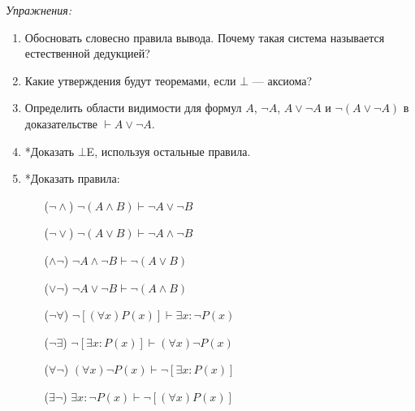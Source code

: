 {\it Упражнения:}
\begin{enumerate}
	\item{}Обосновать словесно правила вывода. Почему такая система называется
	естественной дедукцией?
	\item{}Какие утверждения будут теоремами, если $\bot$ --- аксиома?
	\item{}Определить области видимости для формул $A$, $\lnot A$, $A\lor\lnot A$
	и $\lnot(A\lor\lnot A)$ в доказательстве $\vdash A\lor\lnot A$.
	\item{}*Доказать $\bot$E, используя остальные правила.
	\pagebreak
	\item{}*Доказать правила:
	\begin{multicols}{2}
		\begin{enumerate}
			\item[($\lnot\land$)]{}$\lnot(A\land B)\vdash \lnot A\lor \lnot B$
			\item[($\lnot\lor$)]{}$\lnot(A\lor B)\vdash \lnot A\land \lnot B$
			\item[($\land\lnot$)]{}$\lnot A\land\lnot B\vdash \lnot(A\lor B)$
			\item[($\lor\lnot$)]{}$\lnot A\lor\lnot B\vdash \lnot(A\land B)$
			\item[($\lnot\forall$)]{}$\lnot[(\forall x)P(x)]\vdash\exists x:\lnot P(x)$
			\item[($\lnot\exists$)]{}$\lnot[\exists x:P(x)]\vdash (\forall x)\lnot P(x)$
			\item[($\forall\lnot$)]{}$(\forall x)\lnot P(x)\vdash \lnot[\exists x:P(x)]$
			\item[($\exists\lnot$)]{}$\exists x:\lnot P(x)\vdash \lnot[(\forall x)P(x)]$
		\end{enumerate}
	\end{multicols}
\end{enumerate}

